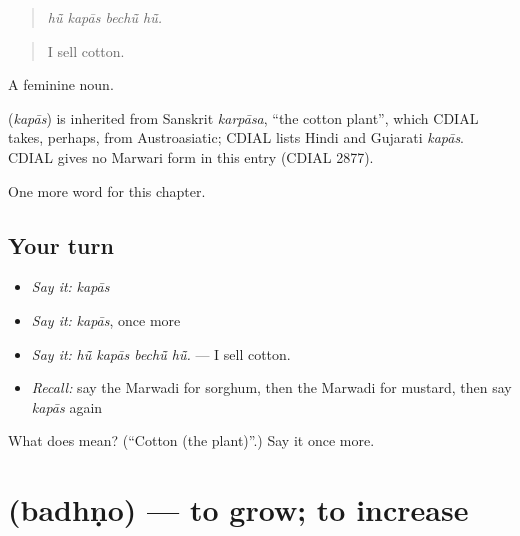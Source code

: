 \begin{quote}
   
\end{quote}

\begin{quote}
\emph{hū̃ kapās bechū̃ hū̃.}
\end{quote}

\begin{quote}
I sell cotton.
\end{quote}

A feminine noun.

\begin{cousinweb}
\textbf{} (\emph{kapās}) is inherited from Sanskrit \emph{karpāsa}, \textquotedblleft{}the cotton plant\textquotedblright{}, which CDIAL takes, perhaps, from Austroasiatic; CDIAL lists Hindi and Gujarati \emph{kapās}. CDIAL gives no Marwari form in this entry (CDIAL 2877).
\end{cousinweb}

\begin{grammarlens}[title={What you've built}]
One more word for this chapter.
\end{grammarlens}

\subsection*{Your turn}
\begin{itemize}
\raggedright
  \item \emph{Say it:} \emph{kapās}
  \item \emph{Say it:} \emph{kapās}, once more
  \item \emph{Say it:} \emph{hū̃ kapās bechū̃ hū̃.} — I sell cotton.
  \item \emph{Recall:} say the Marwadi for sorghum, then the Marwadi for mustard, then say \emph{kapās} again
\end{itemize}

\begin{tcolorbox}[breakable,colback=teal!4,colframe=teal!35!black,title={Before you move on}]
What does  mean? (\textquotedblleft{}Cotton (the plant)\textquotedblright{}.) Say it once more.
\end{tcolorbox}
\section[\texorpdfstring{\mw{बधणो} (badhṇo)}{बधणो (badhṇo)}]{ (badhṇo) — to grow; to increase}

